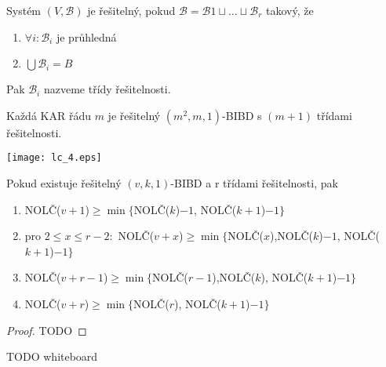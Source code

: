 \begin{definition}
    Systém $(V,\mathcal{B})$ je řešitelný, pokud $\mathcal{B}=\mathcal{B}1\sqcup\ldots\sqcup\mathcal{B}_r$ takový, že
    \begin{enumerate}
        \item $\forall i: \mathcal{B}_i$ je průhledná
        \item $\bigcup\mathcal{B}_i=B$
    \end{enumerate}

    Pak $\mathcal{B}_i$ nazveme třídy řešitelnosti.
\end{definition}

\begin{example}
	Každá KAR řádu $m$ je řešitelný $(m^2, m, 1)$-BIBD s $(m + 1)$ třídami řešitelnosti.

	\texttt{[image: lc\_4.eps]}
\end{example}

\begin{theorem}
    Pokud existuje řešitelný $(v,k,1)$-BIBD a r třídami řešitelnosti, pak
    \begin{enumerate}
        \item NOLČ($v+1$)$\geq\min\{$NOLČ($k$)$-1$, NOLČ($k+1$)$-1\}$
        \item pro $2\leq x\leq r-2:$ NOLČ($v+x$)$\geq\min\{$NOLČ($x$),NOLČ($k$)$-1$, NOLČ($k+1$)$-1\}$
        \item NOLČ($v+r-1$)$\geq\min\{$NOLČ($r-1$),NOLČ($k$), NOLČ($k+1$)$-1\}$
        \item NOLČ($v+r$)$\geq\min\{$NOLČ($r$), NOLČ($k+1$)$-1\}$
    \end{enumerate}
\end{theorem}
\begin{proof}
    TODO
\end{proof}

\begin{example}
	TODO whiteboard
\end{example}

